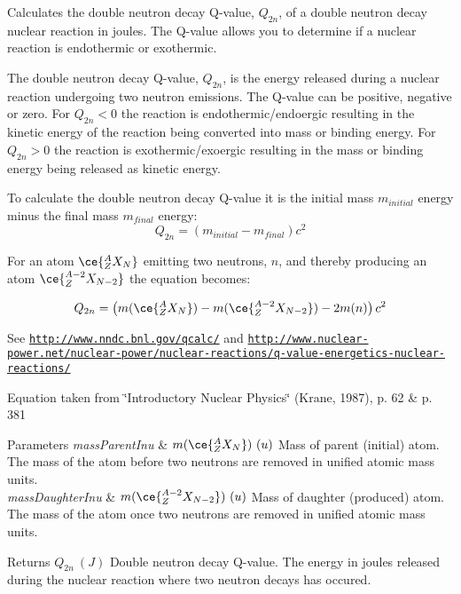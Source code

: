 Calculates the double neutron decay Q-\/value, $Q_{2n}$, of a double neutron decay nuclear reaction in joules. The Q-\/value allows you to determine if a nuclear reaction is endothermic or exothermic. 

The double neutron decay Q-\/value, $Q_{2n}$, is the energy released during a nuclear reaction undergoing two neutron emissions. The Q-\/value can be positive, negative or zero. For $Q_{2n} < 0$ the reaction is endothermic/endoergic resulting in the kinetic energy of the reaction being converted into mass or binding energy. For $Q_{2n} > 0$ the reaction is exothermic/exoergic resulting in the mass or binding energy being released as kinetic energy.

To calculate the double neutron decay Q-\/value it is the initial mass $m_{initial}$ energy minus the final mass $m_{final}$ energy\+: \[Q_{2n} = \left ( m_{initial}-m_{final}\right ) c^2\]

For an atom $\ce{ ^{A}_{Z}X_{N} }$ emitting two neutrons, $n$, and thereby producing an atom $\ce{ ^{A-2}_{Z}X_{N-2} }$ the equation becomes\+:

\[Q_{2n} = \left ( m(\ce{ ^{A}_{Z}X_{N} }) - m(\ce{ ^{A-2}_{Z}X_{N-2} }) - 2m(n) \right ) c^2\]

See \href{http://www.nndc.bnl.gov/qcalc/}{\tt http\+://www.\+nndc.\+bnl.\+gov/qcalc/} and \href{http://www.nuclear-power.net/nuclear-power/nuclear-reactions/q-value-energetics-nuclear-reactions/}{\tt http\+://www.\+nuclear-\/power.\+net/nuclear-\/power/nuclear-\/reactions/q-\/value-\/energetics-\/nuclear-\/reactions/}

Equation taken from \char`\"{}\+Introductory Nuclear Physics\char`\"{} (Krane, 1987), p. 62 \& p. 381


\begin{DoxyParams}{Parameters}
{\em mass\+Parent\+Inu} & $m(\ce{ ^{A}_{Z}X_{N} })\ (u)$ Mass of parent (initial) atom. The mass of the atom before two neutrons are removed in unified atomic mass units. \\
\hline
{\em mass\+Daughter\+Inu} & $m(\ce{ ^{A-2}_{Z}X_{N-2} })\ (u)$ Mass of daughter (produced) atom. The mass of the atom once two neutrons are removed in unified atomic mass units. \\
\hline
\end{DoxyParams}
\begin{DoxyReturn}{Returns}
$Q_{2n}\ (J)$ Double neutron decay Q-\/value. The energy in joules released during the nuclear reaction where two neutron decays has occured. 
\end{DoxyReturn}
\mbox{\label{group___q_value_ga6bfea723aca78b32ea67cc1ca7b4031b}} 
